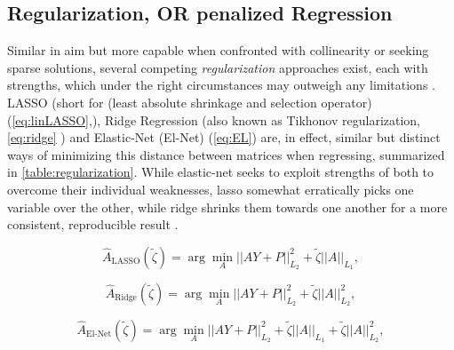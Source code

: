 \subsection{Regularization, OR penalized Regression}
\label{sec:reg}
Similar in aim but more capable when confronted with collinearity or seeking sparse solutions, several competing \emph{regularization} approaches exist, each with strengths, which under the right circumstances may outweigh any limitations \cite[p.69-73,661-668]{friedman2001elements}. LASSO (short for (least absolute shrinkage and selection operator) (\cref{eq:linLASSO},\cite{tibshirani1996regression}), Ridge Regression (also known as Tikhonov regularization, \cref{eq:ridge} \cite{hoerl1970ridge}) and Elastic-Net (El-Net) (\cref{eq:EL}\cite{zou2005regularization}) are, in effect, similar but distinct ways of minimizing this distance between matrices when regressing, summarized in \cref{table:regularization}. While elastic-net seeks to exploit strengths of both to overcome their individual weaknesses, lasso somewhat erratically picks one variable over the other, while ridge shrinks them towards one another for a more consistent, reproducible result \cite{ng2004feature}.

 \begin{equation}\label{eq:linLASSO}
  \hat{A}_{\textrm{LASSO}}(\tilde{\zeta}) = \arg \min_{A} ||A Y+P||^2_{L_2} + \tilde{\zeta} ||A||_{L_1},
\end{equation}

 \begin{equation}\label{eq:ridge}
  \hat{A}_{\textrm{Ridge}}(\tilde{\zeta}) = \arg \min_{A} ||A Y+P||^2_{L_2} + \tilde{\zeta} ||A||^2_{L_2},
\end{equation}

 \begin{equation}\label{eq:EL}
  \hat{A}_{\textrm{El-Net}}(\tilde{\zeta}) = \arg \min_{A} ||A Y+P||^2_{L_2} + \tilde{\zeta} ||A||_{L_1}+ \tilde{\zeta} ||A||^2_{L_2},
\end{equation}


